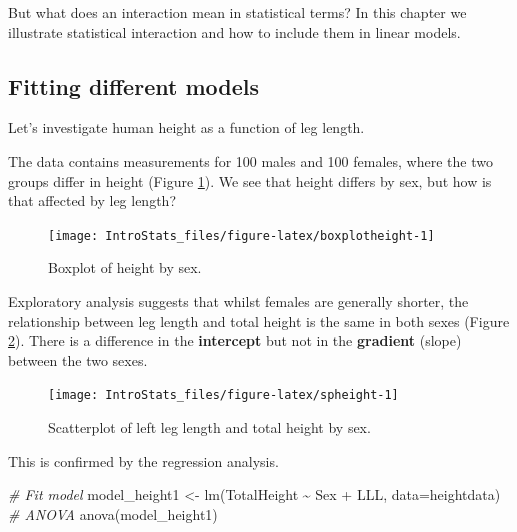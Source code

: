 \documentclass[
  oneside]{krantz}
\newenvironment{Shaded}{\begin{snugshade}}{\end{snugshade}}
\newcommand{\AttributeTok}[1]{\textcolor[rgb]{0.77,0.63,0.00}{#1}}
\newcommand{\CommentTok}[1]{\textcolor[rgb]{0.56,0.35,0.01}{\textit{#1}}}
\newcommand{\FunctionTok}[1]{\textcolor[rgb]{0.00,0.00,0.00}{#1}}
\newcommand{\NormalTok}[1]{#1}
\newcommand{\OtherTok}[1]{\textcolor[rgb]{0.56,0.35,0.01}{#1}}
\newcommand{\SpecialCharTok}[1]{\textcolor[rgb]{0.00,0.00,0.00}{#1}}
\begin{document}
But what does an interaction mean in statistical terms? In this chapter we illustrate statistical interaction and how to include them in linear models.

\hypertarget{fitting-different-models}{%
\subsection{Fitting different models}\label{fitting-different-models}}

Let's investigate human height as a function of leg length.

The data contains measurements for 100 males and 100 females, where the two groups differ in height (Figure \ref{fig:boxplotheight}). We see that height differs by sex, but how is that affected by leg length?

\begin{figure}

{\centering \texttt{[image: IntroStats\_files/figure-latex/boxplotheight-1]} 

}

\caption{Boxplot of height by sex.}\label{fig:boxplotheight}
\end{figure}

\newpage

Exploratory analysis suggests that whilst females are generally shorter, the relationship between leg length and total height is the same in both sexes (Figure \ref{fig:spheight}). There is a difference in the \textbf{intercept} but not in the \textbf{gradient} (slope) between the two sexes.

\begin{figure}

{\centering \texttt{[image: IntroStats\_files/figure-latex/spheight-1]} 

}

\caption{Scatterplot of left leg length and total height by sex.}\label{fig:spheight}
\end{figure}

This is confirmed by the regression analysis.

\begin{Shaded}
\begin{Highlighting}[]
\CommentTok{\# Fit model}
\NormalTok{model\_height1 }\OtherTok{\textless{}{-}} \FunctionTok{lm}\NormalTok{(TotalHeight }\SpecialCharTok{\textasciitilde{}}\NormalTok{ Sex }\SpecialCharTok{+}\NormalTok{ LLL, }\AttributeTok{data=}\NormalTok{heightdata)}
\CommentTok{\# ANOVA}
\FunctionTok{anova}\NormalTok{(model\_height1)}
\end{Highlighting}
\end{Shaded}
\end{document}
